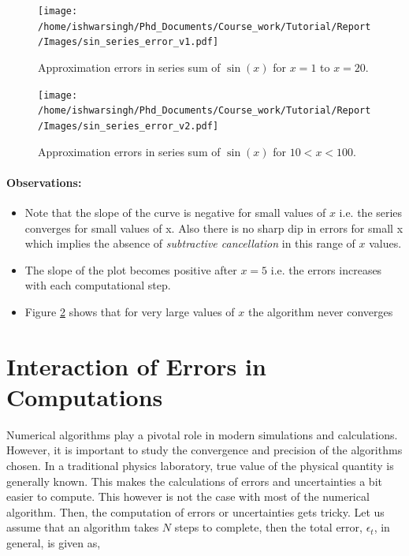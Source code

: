 \documentclass[a4,12pt]{article}
\numberwithin{equation}{subsection}
\begin{document}
\begin{figure}[h]
    \centering
    \texttt{[image: /home/ishwarsingh/Phd\_Documents/Course\_work/Tutorial/Report/Images/sin\_series\_error\_v1.pdf]}
  \caption{Approximation errors in series sum of $\sin(x)$ for $x=1$ to $x=20$.}
  \label{fig:sin_series_error1}
\end{figure}

\begin{figure}[h]
    \centering
    \texttt{[image: /home/ishwarsingh/Phd\_Documents/Course\_work/Tutorial/Report/Images/sin\_series\_error\_v2.pdf]}
  \caption{Approximation errors in series sum of $\sin(x)$ for $10<x<100$.}
  \label{fig:sin_series_error2}
\end{figure}

\paragraph{Observations:}
  \begin{itemize}
    \item Note that the slope of the curve is negative for small values of $x$ i.e. the series converges for small values of x. Also there is no sharp dip in errors for small x which implies the absence of \emph{subtractive cancellation} in this range of $x$ values.
    \item The slope of the plot becomes positive after $x=5$ i.e. the errors increases with each computational step.
    \item Figure \ref{fig:sin_series_error2} shows that for very large values of $x$ the algorithm never converges
  \end{itemize}  




\section{Interaction of Errors in Computations}
Numerical algorithms play a pivotal role in modern simulations and calculations. However, it is important to study the convergence and precision of the algorithms chosen. In a traditional physics laboratory, true value of the physical quantity is generally known. This makes the calculations of errors and uncertainties a bit easier to compute. This however is not the case with most of the numerical algorithm. Then, the computation of errors or uncertainties gets tricky. Let us assume that an algorithm takes $N$ steps to complete, then the total error, $\epsilon_{t}$, in general, is given as,
\end{document}
